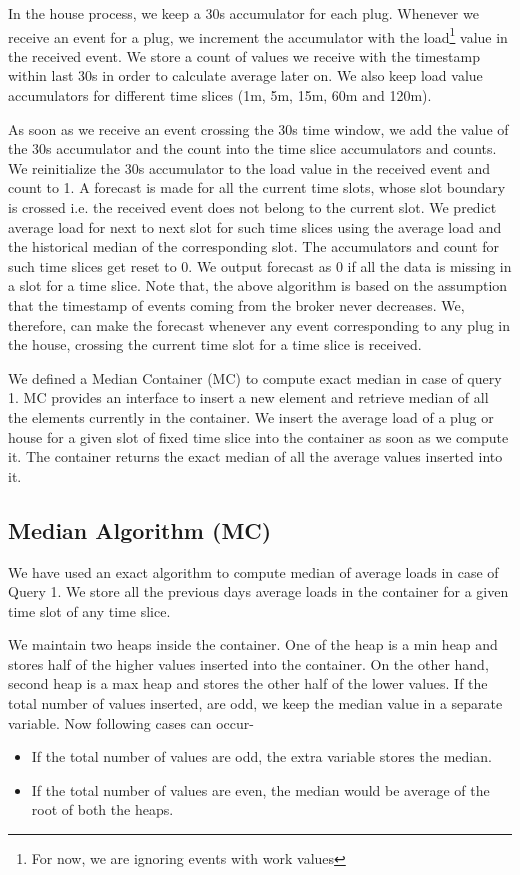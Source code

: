 In the house process, we keep a 30s accumulator for each plug. Whenever we receive an event for a plug, we increment the accumulator with the load\footnote{For now, we are ignoring events with work values} value in the received event. We store a count of values we receive with the timestamp within last 30s in order to calculate average later on. We also keep load value accumulators for different time slices (1m, 5m, 15m, 60m and 120m). 

As soon as we receive an event crossing the 30s time window, we add the value of the 30s accumulator and the count into the time slice accumulators and counts. We reinitialize the 30s accumulator to the load value in the received event and count to 1. A forecast is made for all the current time slots, whose slot boundary is crossed i.e. the received event does not belong to the current slot. We predict average load for next to next slot for such time slices using the average load and the historical median of the corresponding slot. The accumulators and count for such time slices get reset to 0. We output forecast as 0 if all the data is missing in a slot for a time slice. Note that, the above algorithm is based on the assumption that the timestamp of events coming from the broker never decreases. We, therefore, can make the forecast whenever any event corresponding to any plug in the house, crossing the current time slot for a time slice is received.

We defined a Median Container (MC) to compute exact median in case of query 1. MC provides an interface to insert a new element and retrieve median of all the elements currently in the container. We insert the average load of a plug or house for a given slot of fixed time slice into the container as soon as we compute it. The container returns the exact median of all the average values inserted into it.

\subsection{Median Algorithm (MC)}
We have used an exact algorithm to compute median of average loads in case of Query 1. We store all the previous days average loads in the container for a given time slot of any time slice.

We maintain two heaps inside the container. One of the heap is a min heap and stores half of the higher values inserted into the container. On the other hand, second heap is a max heap and stores the other half of the lower values. If the total number of values inserted, are odd, we keep the median value in a separate variable. Now following cases can occur-
\begin{itemize}
\item If the total number of values are odd, the extra variable stores the median.
\item If the total number of values are even, the median would be average of the root of both the heaps.
\end{itemize}

